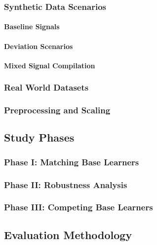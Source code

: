 \documentclass[fontsize=12 pt]{scrartcl}
\begin{document}
\subsubsection{Synthetic Data Scenarios}
\paragraph{Baseline Signals} 
\paragraph{Deviation Scenarios} 
\paragraph{Mixed Signal Compilation} 
\subsubsection{Real World Datasets}
\subsubsection{Preprocessing and Scaling}
\subsection{Study Phases}
\subsubsection{Phase I: Matching Base Learners}
\subsubsection{Phase II: Robustness Analysis}
\subsubsection{Phase III: Competing Base Learners}

\subsection{Evaluation Methodology}
\end{document}
